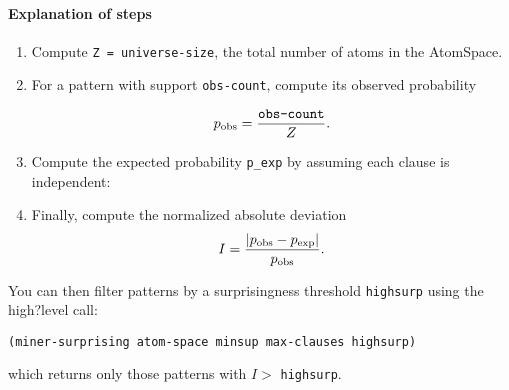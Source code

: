 \documentclass{article}
\begin{document}
\paragraph{Explanation of steps}

\begin{enumerate}

  \item Compute \texttt{Z = universe-size}, the total number of atoms in the AtomSpace.


  \item For a pattern with support \texttt{obs-count}, compute its observed probability

        $$
          p_{\rm obs} = \frac{\texttt{obs-count}}{Z}.
        $$
  \item Compute the expected probability \texttt{p\_exp} by assuming each clause is independent:

  \item Finally, compute the normalized absolute deviation
        $$
          I = .
        $$
\end{enumerate}

You can then filter patterns by a surprisingness threshold \texttt{highsurp} using the high?level call:
\begin{verbatim}
(miner-surprising atom-space minsup max-clauses highsurp)
\end{verbatim}
which returns only those patterns with \(I >\) \texttt{highsurp}.
\end{document}
